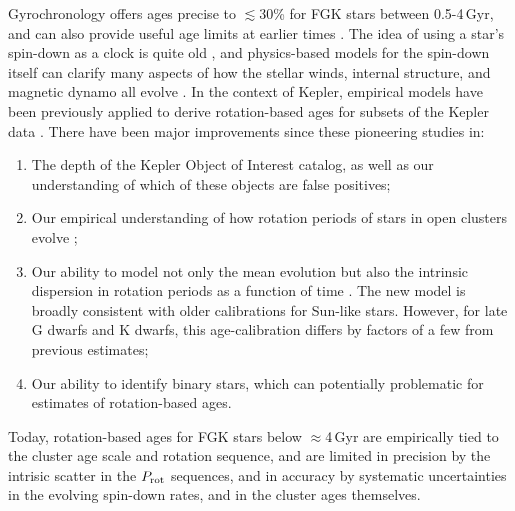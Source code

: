\documentclass[11pt,twocolumn,tighten]{aastex63}
\begin{document}
Gyrochronology offers ages precise to $\lesssim$30\% for FGK stars
between 0.5-4\,Gyr, and can also provide useful age limits at earlier
times \citep{Bouma_2023}.  The idea of using a star's spin-down as a
clock is quite old
\citep{Skumanich_1972,Noyes_1984,Kawaler_1989,Barnes03,Mamajek_2008,Angus_2015},
and physics-based models for the spin-down itself can clarify many
aspects of how the stellar winds, internal structure, and magnetic
dynamo all evolve
\citep[e.g.][]{Matt_2015,Gallet_Bouvier_2015,Spada_2020}.  
In the context of Kepler,
empirical models have been previously applied to derive rotation-based
ages for subsets of the Kepler data
\citep{Walkowicz_2013,Reinhold_2015}.
There have been major improvements since these pioneering studies in:
\begin{enumerate}[label={\it \roman*)}]
  \item The depth of the Kepler Object of Interest catalog, as well as our understanding of which of these objects are
    false positives;
  \item Our empirical understanding of how rotation periods of stars
    in open clusters evolve
    \citep[e.g.][]{Curtis_2019_ngc6811,Gillen_2020,Rampalli_2021,Fritzewski_2021,Rebull_2022,Dungee_2022,2023AJ....166...14B};
  \item Our ability to model not only the mean evolution but also the
    intrinsic dispersion in rotation periods as a function of time
    \citep{Bouma_2023}.  
    The new model is broadly consistent with older calibrations
    \citep[e.g.][]{Mamajek_2008} for Sun-like stars.  However, for
    late G dwarfs and K dwarfs, this age-calibration differs by
    factors of a few from previous estimates;
  \item Our ability to identify binary stars, which can potentially
    problematic for estimates of rotation-based ages.
\end{enumerate}
Today, rotation-based ages for FGK stars below $\approx$4\,Gyr are
empirically tied to the cluster age scale and rotation sequence, and
are limited in precision by the intrisic scatter in the $P_{\rm rot}$
sequences, and in accuracy by systematic uncertainties in the evolving
spin-down rates, and in the cluster ages themselves.  
\end{document}
